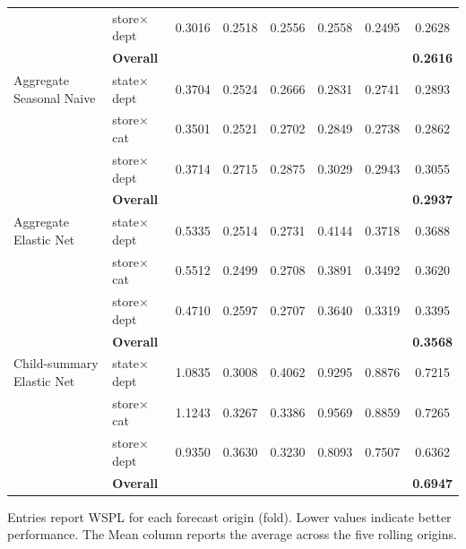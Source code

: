 \begin{table}[H]
\begin{threeparttable}
\begin{tabular}{llccccc|c}
                                   & store$\times$dept      &   0.3016 &   0.2518 &   0.2556 &   0.2558 &   0.2495 &   0.2628 \\
                                   & {\bf Overall} & & & & & & {\bf 0.2616} \\
      \addlinespace
      Aggregate Seasonal Naive     & state$\times$dept      &   0.3704 &   0.2524 &   0.2666 &   0.2831 &   0.2741 &   0.2893 \\
                                   & store$\times$cat       &   0.3501 &   0.2521 &   0.2702 &   0.2849 &   0.2738 &   0.2862 \\
                                   & store$\times$dept      &   0.3714 &   0.2715 &   0.2875 &   0.3029 &   0.2943 &   0.3055 \\
                                   & {\bf Overall} & & & & & & {\bf 0.2937} \\
      \addlinespace
      Aggregate Elastic Net        & state$\times$dept      &   0.5335 &   0.2514 &   0.2731 &   0.4144 &   0.3718 &   0.3688 \\
                                   & store$\times$cat       &   0.5512 &   0.2499 &   0.2708 &   0.3891 &   0.3492 &   0.3620 \\
                                   & store$\times$dept      &   0.4710 &   0.2597 &   0.2707 &   0.3640 &   0.3319 &   0.3395 \\
                                   & {\bf Overall} & & & & & & {\bf 0.3568} \\
      \addlinespace
      Child-summary Elastic Net    & state$\times$dept      &   1.0835 &   0.3008 &   0.4062 &   0.9295 &   0.8876 &   0.7215 \\
                                   & store$\times$cat       &   1.1243 &   0.3267 &   0.3386 &   0.9569 &   0.8859 &   0.7265 \\
                                   & store$\times$dept      &   0.9350 &   0.3630 &   0.3230 &   0.8093 &   0.7507 &   0.6362 \\
                                   & {\bf Overall} & & & & & & {\bf 0.6947} \\
      \bottomrule
    \end{tabular}
    \begin{tablenotes}
      \footnotesize \item Entries report WSPL for each forecast origin (fold). Lower values indicate better performance. The Mean column reports the average across the five rolling origins.
    \end{tablenotes}
  \end{threeparttable}
\end{table}